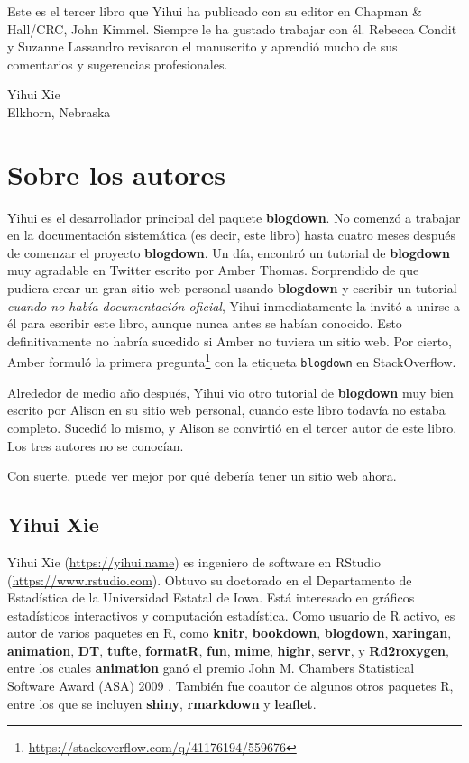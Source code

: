 \documentclass[12pt,]{krantz}
\renewcommand{\href}[2]{#2\footnote{\url{#1}}}
\theoremstyle{definition}
\theoremstyle{definition}
\theoremstyle{definition}
\theoremstyle{remark}
\let\BeginKnitrBlock\begin \let\EndKnitrBlock\end
\begin{document}
Este es el tercer libro que Yihui ha publicado con su editor en Chapman
\& Hall/CRC, John Kimmel. Siempre le ha gustado trabajar con él. Rebecca
Condit y Suzanne Lassandro revisaron el manuscrito y aprendió mucho de
sus comentarios y sugerencias profesionales.

\BeginKnitrBlock{flushright}
Yihui Xie\\
Elkhorn, Nebraska
\EndKnitrBlock{flushright}

\hypertarget{author}{%
\chapter*{Sobre los autores}\label{author}}


Yihui es el desarrollador principal del paquete \textbf{blogdown}. No
comenzó a trabajar en la documentación sistemática (es decir, este
libro) hasta cuatro meses después de comenzar el proyecto
\textbf{blogdown}. Un día, encontró un tutorial de \textbf{blogdown} muy
agradable en Twitter escrito por Amber Thomas. Sorprendido de que
pudiera crear un gran sitio web personal usando \textbf{blogdown} y
escribir un tutorial \emph{cuando no había documentación oficial}, Yihui
inmediatamente la invitó a unirse a él para escribir este libro, aunque
nunca antes se habían conocido. Esto definitivamente no habría sucedido
si Amber no tuviera un sitio web. Por cierto, Amber formuló
\href{https://stackoverflow.com/q/41176194/559676}{la primera pregunta}
con la etiqueta \texttt{blogdown} en StackOverflow.

Alrededor de medio año después, Yihui vio otro tutorial de
\textbf{blogdown} muy bien escrito por Alison en su sitio web personal,
cuando este libro todavía no estaba completo. Sucedió lo mismo, y Alison
se convirtió en el tercer autor de este libro. Los tres autores no se
conocían.

Con suerte, puede ver mejor por qué debería tener un sitio web ahora.

\hypertarget{yihui-xie}{%
\section*{Yihui Xie}\label{yihui-xie}}


Yihui Xie (\url{https://yihui.name}) es ingeniero de software en RStudio
(\url{https://www.rstudio.com}). Obtuvo su doctorado en el Departamento
de Estadística de la Universidad Estatal de Iowa. Está interesado en
gráficos estadísticos interactivos y computación estadística. Como
usuario de R activo, es autor de varios paquetes en R, como
\textbf{knitr}, \textbf{bookdown}, \textbf{blogdown}, \textbf{xaringan},
\textbf{animation}, \textbf{DT}, \textbf{tufte}, \textbf{formatR},
\textbf{fun}, \textbf{mime}, \textbf{highr}, \textbf{servr}, y
\textbf{Rd2roxygen}, entre los cuales \textbf{animation} ganó el premio
John M. Chambers Statistical Software Award (ASA) 2009 . También fue
coautor de algunos otros paquetes R, entre los que se incluyen
\textbf{shiny}, \textbf{rmarkdown} y \textbf{leaflet}.
\end{document}
